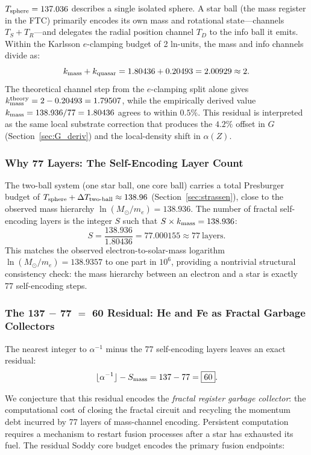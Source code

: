 \documentclass[11pt,a4paper]{article}
\begin{document}
$T_{\rm sphere} = 137.036$ describes a single isolated sphere. A star ball (the mass register in the FTC) primarily encodes its own mass and rotational state---channels $T_S + T_R$---and delegates the radial position channel $T_D$ to the info ball it emits. Within the Karlsson $e$-clamping budget of 2 ln-units, the mass and info channels divide as:
\[
k_{\rm mass} + k_{\rm quasar} = 1.80436 + 0.20493 = 2.00929 \approx 2.
\]
The theoretical channel step from the $e$-clamping split alone gives $k_{\rm mass}^{\rm theory} = 2 - 0.20493 = 1.79507$, while the empirically derived value $k_{\rm mass} = 138.936/77 = 1.80436$ agrees to within $0.5\%$. This residual is interpreted as the same local substrate correction that produces the $4.2\%$ offset in $G$ (Section~\ref{sec:G_deriv}) and the local-density shift in $\alpha(Z)$.

\subsubsection{Why 77 Layers: The Self-Encoding Layer Count}

The two-ball system (one star ball, one core ball) carries a total Presburger budget of $T_{\rm sphere} + \Delta T_{\rm two\text{-}ball} \approx 138.96$ (Section~\ref{sec:strassen}), close to the observed mass hierarchy $\ln(M_\odot/m_e) = 138.936$. The number of fractal self-encoding layers is the integer $S$ such that $S \times k_{\rm mass} = 138.936$:
\[
S = \frac{138.936}{1.80436} = 77.000155 \approx \boxed{77\ \text{layers}}.
\]
This matches the observed electron-to-solar-mass logarithm $\ln(M_\odot/m_e) = 138.9357$ to one part in $10^6$, providing a nontrivial structural consistency check: the mass hierarchy between an electron and a star is exactly 77 self-encoding steps.

\subsubsection{The 137 $-$ 77 $=$ 60 Residual: He and Fe as Fractal Garbage Collectors}

The nearest integer to $\alpha^{-1}$ minus the 77 self-encoding layers leaves an exact residual:
\[
\lfloor\alpha^{-1}\rfloor - S_{\rm mass} = 137 - 77 = \boxed{60}.
\]

We conjecture that this residual encodes the \emph{fractal register garbage collector}: the computational cost of closing the fractal circuit and recycling the momentum debt incurred by 77 layers of mass-channel encoding. Persistent computation requires a mechanism to restart fusion processes after a star has exhausted its fuel. The residual Soddy core budget encodes the primary fusion endpoints:
\end{document}
